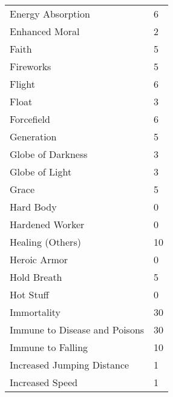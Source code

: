 \documentclass[twoside]{book}
\begin{document}
\begin{longtable}{p{1.25in}l}
  \raggedright
           Energy Absorption 
  &
   6 
  \tabularnewline
      
  \raggedright
           Enhanced Moral 
  &
   2 
  \tabularnewline
      
  \raggedright
           Faith 
  &
   5 
  \tabularnewline
      
  \raggedright
           Fireworks 
  &
   5 
  \tabularnewline
      
  \raggedright
           Flight 
  &
   6 
  \tabularnewline
      
  \raggedright
           Float 
  &
   3 
  \tabularnewline
      
  \raggedright
           Forcefield 
  &
   6 
  \tabularnewline
      
  \raggedright
           Generation 
  &
   5 
  \tabularnewline
      
  \raggedright
           Globe of Darkness 
  &
   3 
  \tabularnewline
      
  \raggedright
           Globe of Light 
  &
   3 
  \tabularnewline
      
  \raggedright
           Grace 
  &
   5 
  \tabularnewline
      
  \raggedright
           Hard Body 
  &
   0 
  \tabularnewline
      
  \raggedright
           Hardened Worker 
  &
   0 
  \tabularnewline
      
  \raggedright
           Healing (Others) 
  &
   10 
  \tabularnewline
      
  \raggedright
           Heroic Armor 
  &
   0 
  \tabularnewline
      
  \raggedright
           Hold Breath 
  &
   5 
  \tabularnewline
      
  \raggedright
           Hot Stuff 
  &
   0 
  \tabularnewline
      
  \raggedright
           Immortality 
  &
   30 
  \tabularnewline
      
  \raggedright
           Immune to Disease and Poisons
           
  &
   30 
  \tabularnewline
      
  \raggedright
           Immune to Falling 
  &
   10 
  \tabularnewline
      
  \raggedright
           Increased Jumping Distance
           
  &
   1 
  \tabularnewline
      
  \raggedright
           Increased Speed 
  &
   1 
  \tabularnewline
      

\end{longtable}
\end{document}
